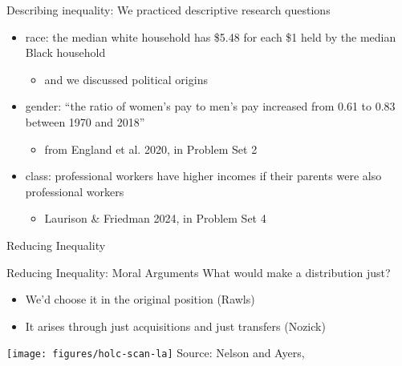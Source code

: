 \documentclass{beamer}
\newcommand\bref[2]{\href{#1}{\color{blue}{#2}}}
\begin{document}
\begin{frame}{Describing inequality: We practiced descriptive research questions}

\begin{itemize}
\item race: the median white household has \$5.48 for each \$1 held by the median Black household
\begin{itemize}
\item and we discussed political origins
\end{itemize} \pause
\item gender: ``the ratio of women's pay to men's pay increased from 0.61 to 0.83 between 1970 and 2018''
\begin{itemize}
\item from England et al. 2020, in Problem Set 2
\end{itemize} \pause
\item class: professional workers have higher incomes if their parents were also professional workers
\begin{itemize}
\item Laurison \& Friedman 2024, in Problem Set 4
\end{itemize}
\end{itemize}

\end{frame}

\begin{frame}
\huge Reducing Inequality
\end{frame}

\begin{frame}{Reducing Inequality: Moral Arguments}
What would make a distribution just? \pause
\begin{itemize}
\item We'd choose it in the original position \hfill (Rawls) \pause
\item It arises through just acquisitions and just transfers \hfill (Nozick)
\end{itemize}
\end{frame}

\begin{frame}
\texttt{[image: figures/holc-scan-la]}
Source: Nelson and Ayers, \bref{https://dsl.richmond.edu/panorama/redlining/}{Mapping Inequality}
\end{frame}
\end{document}
